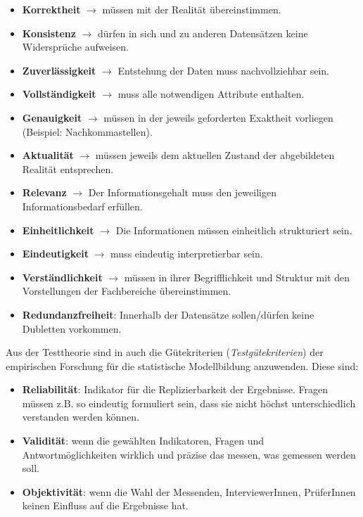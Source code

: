 \documentclass[]{article}
\providecommand{\tightlist}{%
  \setlength{\itemsep}{0pt}\setlength{\parskip}{0pt}}
\begin{document}
\begin{itemize}
\tightlist
\item
  \textbf{Korrektheit} \(\rightarrow\) müssen mit der Realität
  übereinstimmen.
\item
  \textbf{Konsistenz} \(\rightarrow\) dürfen in sich und zu anderen
  Datensätzen keine Widersprüche aufweisen.
\item
  \textbf{Zuverlässigkeit} \(\rightarrow\) Entstehung der Daten muss
  nachvollziehbar sein.
\item
  \textbf{Vollständigkeit} \(\rightarrow\) muss alle notwendigen
  Attribute enthalten.
\item
  \textbf{Genauigkeit} \(\rightarrow\) müssen in der jeweils geforderten
  Exaktheit vorliegen (Beispiel: Nachkommastellen).
\item
  \textbf{Aktualität} \(\rightarrow\) müssen jeweils dem aktuellen
  Zustand der abgebildeten Realität entsprechen.
\item
  \textbf{Relevanz} \(\rightarrow\) Der Informationsgehalt muss den
  jeweiligen Informationsbedarf erfüllen.
\item
  \textbf{Einheitlichkeit} \(\rightarrow\) Die Informationen müssen
  einheitlich strukturiert sein.
\item
  \textbf{Eindeutigkeit} \(\rightarrow\) muss eindeutig interpretierbar
  sein.
\item
  \textbf{Verständlichkeit} \(\rightarrow\) müssen in ihrer
  Begrifflichkeit und Struktur mit den Vorstellungen der Fachbereiche
  übereinstimmen.
\item
  \textbf{Redundanzfreiheit}: Innerhalb der Datensätze sollen/dürfen
  keine Dubletten vorkommen.
\end{itemize}

Aus der Testtheorie sind in auch die Gütekriterien
(\emph{Testgütekriterien}) der empirischen Forschung für die
statistische Modellbildung anzuwenden. Diese sind:

\begin{itemize}
\tightlist
\item
  \textbf{Reliabilität}: Indikator für die Replizierbarkeit der
  Ergebnisse. Fragen müssen z.B. so eindeutig formuliert sein, dass sie
  nicht höchst unterschiedlich verstanden werden können.
\item
  \textbf{Validität}: wenn die gewählten Indikatoren, Fragen und
  Antwortmöglichkeiten wirklich und präzise das messen, was gemessen
  werden soll.
\item
  \textbf{Objektivität}: wenn die Wahl der Messenden, InterviewerInnen,
  PrüferInnen keinen Einfluss auf die Ergebnisse hat.
\end{itemize}
\end{document}
